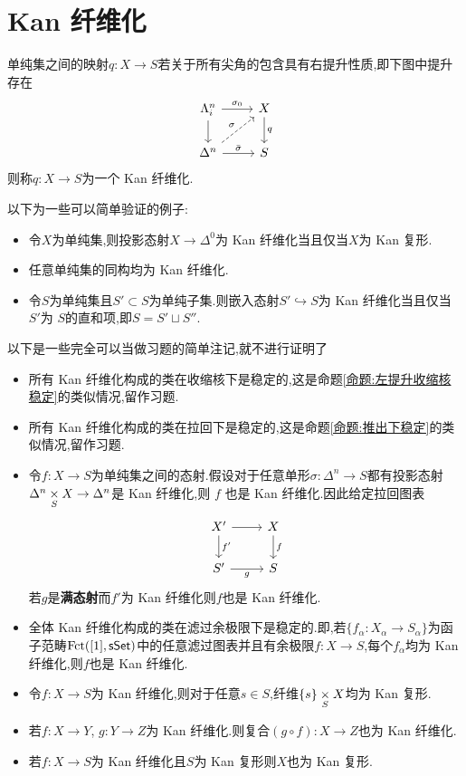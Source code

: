 \section{Kan 纤维化}
\begin{definition}
    单纯集之间的映射$q:X \to S$若关于所有尖角的包含具有右提升性质,即下图中提升存在
    \[\begin{tikzcd}
	{\Lambda_i^n} & X \\
	{\Delta^n} & S
	\arrow["{\sigma_0}", from=1-1, to=1-2]
	\arrow[from=1-1, to=2-1]
	\arrow["q", from=1-2, to=2-2]
	\arrow["\sigma", dashed, from=2-1, to=1-2]
	\arrow["{\bar{\sigma}}", from=2-1, to=2-2]
    \end{tikzcd}\]
    则称$q:X\to S$为一个 Kan 纤维化.
\end{definition}
\begin{example}\label{例:Kan 纤维化}
    以下为一些可以简单验证的例子:
    \begin{itemize}
        \item 令$X$为单纯集,则投影态射$X\to \Delta^0$为 Kan 纤维化当且仅当$X$为 Kan 复形.
        \item 任意单纯集的同构均为 Kan 纤维化.
        \item 令$S$为单纯集且$S' \subset S$为单纯子集.则嵌入态射$S' \hookrightarrow S$为 Kan 纤维化当且仅当 $S'$为 $S$的直和项,即$S = S'\sqcup S''$.
    \end{itemize}
\end{example}
\begin{remark}
    以下是一些完全可以当做习题的简单注记,就不进行证明了
    \begin{itemize}
    \item 所有 Kan 纤维化构成的类在收缩核下是稳定的,这是命题\ref{命题:左提升收缩核稳定}的类似情况,留作习题.
    \item 所有 Kan 纤维化构成的类在拉回下是稳定的,这是命题\ref{命题:推出下稳定}的类似情况,留作习题.
    \item 令$f: X \to S$为单纯集之间的态射.假设对于任意单形$\sigma: \Delta^n \to S$都有投影态射$\Delta^n \underset{S}{\times} X\to \Delta^n$是 Kan 纤维化,则 $f$ 也是 Kan 纤维化.因此给定拉回图表
    \[\begin{tikzcd}
	{X'} & X \\
	{S'} & S
	\arrow[from=1-1, to=1-2]
	\arrow["{f'}", from=1-1, to=2-1]
	\arrow["f", from=1-2, to=2-2]
	\arrow["g"', from=2-1, to=2-2]
    \end{tikzcd}\]
    若$g$是\textbf{满态射}而$f'$为 Kan 纤维化则$f$也是 Kan 纤维化.
    \item 全体 Kan 纤维化构成的类在滤过余极限下是稳定的.即,若$\{f_{\alpha}: X_{\alpha} \to S_{\alpha}\}$为函子范畴$\operatorname{Fct}([1],\mathsf{sSet})$中的任意滤过图表并且有余极限$f: X \to S$,每个$f_{\alpha}$均为 Kan 纤维化,则$f$也是 Kan 纤维化.
    \item 令$f:X \to S$为 Kan 纤维化,则对于任意$s\in S$,纤维$\{s\}\underset{S}{\times} X$均为 Kan 复形.
    \item 若$f:X \to Y$, $g: Y \to Z$为 Kan 纤维化.则复合$(g\circ f):X \to Z$也为 Kan 纤维化.
    \item 若$f:X \to S$为 Kan 纤维化且$S$为 Kan 复形则$X$也为 Kan 复形.
    \end{itemize}
\end{remark}
